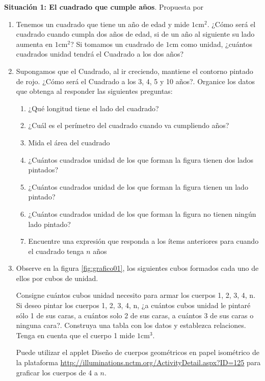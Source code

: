 \begin{center}
	\begin{minipage}{0.8\linewidth}
		\textbf{Situación 1: El cuadrado que cumple años}. Propuesta por \textcite{audisio2019}
		
		\begin{enumerate}
			\item Tenemos un cuadrado que tiene un año de edad y mide $1 \text{cm}^2$. ¿Cómo será el cuadrado cuando cumpla dos años de edad, si de un año al siguiente su lado aumenta en $1 \text{cm}^2$? Si tomamos un cuadrado de $1 \text{cm}$ como unidad, ¿cuántos cuadrados unidad tendrá el Cuadrado a los dos años?
			\item Supongamos que el Cuadrado, al ir creciendo, mantiene el contorno pintado de rojo. ¿Cómo será el Cuadrado a los 3, 4, 5 y 10 años?. Organice los datos que obtenga al responder las siguientes preguntas:
			\begin{enumerate}[a]
				\item ¿Qué longitud tiene el lado del cuadrado?
				\item ¿Cuál es el perímetro del cuadrado cuando va cumpliendo años?
				\item Mida el área del cuadrado
				\item ¿Cuántos cuadrados unidad de los que forman la figura tienen dos lados pintados?
				\item ¿Cuántos cuadrados unidad de los que forman la figura tienen un lado pintado?
				\item ¿Cuántos cuadrados unidad de los que forman la figura no tienen ningún lado pintado?
				\item Encuentre una expresión que responda a los ítems anteriores para cuando el cuadrado tenga $n$ años
			\end{enumerate}
			
			\item Observe en la figura \ref{fig:grafico01}, los siguientes cubos formados cada uno de ellos por cubos de unidad.
			
			Consigne cuántos cubos unidad necesito para armar los cuerpos 1, 2, 3, 4, n. Si deseo pintar los cuerpos 1, 2, 3, 4, n, ¿a cuántos cubos unidad le pintaré sólo 1 de sus caras, a cuántos solo 2 de sus caras, a cuántos 3 de sus caras o ninguna cara?. Construya una tabla con los datos y establezca relaciones. Tenga en cuenta que el cuerpo 1 mide $1 \text{cm}^3$.
			
			Puede utilizar el applet Diseño de cuerpos geométricos en papel isométrico de la plataforma \url{http://illuminations.nctm.org/ActivityDetail.aspx?ID=125} para graficar los cuerpos de 4 a $n$.
		\end{enumerate}
	\end{minipage}
	

\end{center}
